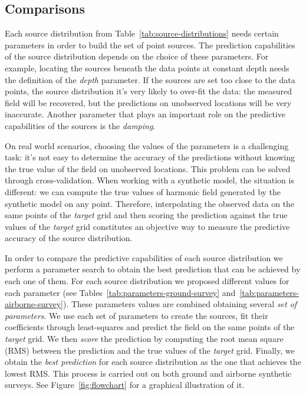 \documentclass[twocolumn]{article}
\begin{document}
\subsection{Comparisons}

Each source distribution from Table~\ref{tab:source-distributions} needs
certain parameters in order to build the set of point sources.
The prediction capabilities of the source distribution depends on the choice of
these parameters.
For example, locating the sources beneath the data points at constant depth
needs the definition of the \emph{depth} parameter.
If the sources are set too close to the data points, the source distribution
it's very likely to over-fit the data: the measured field will be recovered, but
the predictions on unobserved locations will be very inaccurate.
Another parameter that plays an important role on the predictive capabilities
of the sources is the \emph{damping}.

On real world scenarios, choosing the values of the parameters is a challenging
task: it's not easy to determine the accuracy of the predictions without
knowing the true value of the field on unobserved locations.
This problem can be solved through cross-validation.
When working with a synthetic model, the situation is different: we can compute
the true values of harmonic field generated by the synthetic model on any
point.
Therefore, interpolating the observed data on the same points of the
\emph{target} grid and then scoring the prediction against the true values of
the \emph{target} grid constitutes an objective way to measure the predictive
accuracy of the source distribution.

In order to compare the predictive capabilities of each source distribution we
perform a parameter search to obtain the best prediction that can be achieved
by each one of them.
For each source distribution we proposed different values for each parameter
(see Tables~\ref{tab:parameters-ground-survey}
and~\ref{tab:parameters-airborne-survey}).
These parameters values are combined obtaining several \emph{set of
parameters}.
We use each set of parameters to create the sources, fit their coefficients
through least-squares and predict the field on the same points of the
\emph{target} grid.
We then \emph{score} the prediction by computing the root mean square (RMS)
between the prediction and the true values of the \emph{target} grid.
Finally, we obtain the \emph{best prediction} for each source distribution as
the one that achieves the lowest RMS.
This process is carried out on both ground and airborne synthetic surveys.
See Figure~\ref{fig:flowchart} for a graphical illustration of it.
\end{document}
